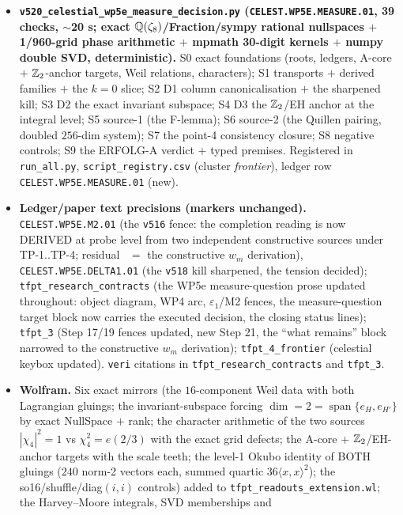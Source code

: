 \begin{itemize}[leftmargin=1.5em]
\item \textbf{\texttt{v520\_celestial\_wp5e\_measure\_decision.py} (\texttt{CELEST.WP5E.MEASURE.01},
39 checks, $\sim$20 s; exact $\mathbb{Q}(\zeta_8)$/Fraction/sympy rational nullspaces $+$ 1/960-grid
phase arithmetic $+$ mpmath 30-digit kernels $+$ numpy double SVD, deterministic).} S0 exact
foundations (roots, ledgers, A-core $+$ $\mathbb{Z}_2$-anchor targets, Weil relations, characters); S1
transports $+$ derived families $+$ the $k=0$ slice; S2 D1 column canonicalisation $+$ the
sharpened kill; S3 D2 the exact invariant subspace; S4 D3 the $\mathbb{Z}_2$/EH anchor at the integral
level; S5 source-1 (the F-lemma); S6 source-2 (the Quillen pairing, doubled $256$-dim system);
S7 the point-4 consistency closure; S8 negative controls; S9 the ERFOLG-A verdict $+$ typed
premises. Registered in \texttt{run\_all.py}, \texttt{script\_registry.csv} (cluster
\emph{frontier}), ledger row \texttt{CELEST.WP5E.MEASURE.01} (new).
\item \textbf{Ledger/paper text precisions (markers unchanged).} \texttt{CELEST.WP5E.M2.01}
(the \texttt{v516} fence: the completion reading is now DERIVED at probe level from two
independent constructive sources under TP-1..TP-4; residual \mO\ $=$ the constructive $w_m$
derivation), \texttt{CELEST.WP5E.DELTA1.01} (the \texttt{v518} kill sharpened, the tension
decided); \texttt{tfpt\_research\_contracts} (the WP5e measure-question prose updated
throughout: object diagram, WP4 arc, $\varepsilon_1$/M2 fences, the measure-question target
block now carries the executed decision, the closing status lines);
\texttt{tfpt\_3} (Step 17/19 fences updated, new Step 21, the ``what remains'' block narrowed
to the constructive $w_m$ derivation); \texttt{tfpt\_4\_frontier} (celestial keybox updated).
\texttt{veri} citations in \texttt{tfpt\_research\_contracts} and \texttt{tfpt\_3}.
\item \textbf{Wolfram.} Six exact mirrors (the $16$-component Weil data with both Lagrangian
gluings; the invariant-subspace forcing $\dim=2=\operatorname{span}\{e_H,e_{H'}\}$ by exact
NullSpace $+$ rank; the character arithmetic of the two sources $|\chi_4|^2=1$ vs
$\chi_4^2=e(2/3)$ with the exact grid defects; the A-core $+$ $\mathbb{Z}_2$/EH-anchor targets with
the scale teeth; the level-1 Okubo identity of BOTH gluings ($240$ norm-2 vectors each, summed
quartic $36\langle x,x\rangle^2$); the so16/shuffle/diag$(i,i)$ controls) added to
\texttt{tfpt\_readouts\_extension.wl}; the Harvey--Moore integrals, SVD memberships and

\end{itemize}
